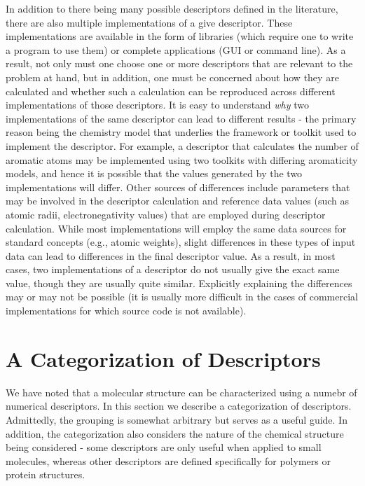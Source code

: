 \documentclass[letterpaper, 12pt]{article}
\begin{document}
In addition to there being many possible descriptors defined in the
literature, there are also multiple implementations of a give
descriptor. These implementations are available in the form of
libraries (which require one to write a program to use them) or
complete applications (GUI or command line). As a result, not only
must one choose one or more descriptors that are relevant to the
problem at hand, but in addition, one must be concerned about how they
are calculated and whether such a calculation can be reproduced across
different implementations of those descriptors. It is easy to
understand \emph{why} two implementations of the same descriptor can
lead to different results - the primary reason being the chemistry
model that underlies the framework or toolkit used to implement the
descriptor. For example, a descriptor that calculates the number of
aromatic atoms may be implemented using two toolkits with differing
aromaticity models, and hence it is possible that the values generated
by the two implementations will differ. Other sources of differences
include parameters that may be involved in the descriptor calculation
and reference data values (such as atomic radii, electronegativity
values) that are employed during descriptor calculation. While most
implementations will employ the same data sources for standard
concepts (e.g., atomic weights), slight differences in these types of
input data can lead to differences in the final descriptor value. As a
result, in most cases, two implementations of a descriptor do not
usually give the exact same value, though they are usually quite
similar. Explicitly explaining the differences may or may not be
possible (it is usually more difficult in the cases of commercial
implementations for which source code is not available).

\section{A Categorization of Descriptors}
\label{sec:categ-descr}

We have noted that a molecular structure can be characterized using a
numebr of numerical descriptors. In this section we describe a
categorization of descriptors. Admittedly, the grouping is somewhat
arbitrary but serves as a useful guide. In addition, the
categorization also considers the nature of the chemical structure
being considered - some descriptors are only useful when applied to
small molecules, whereas other descriptors are defined specifically
for polymers or protein structures.
\end{document}
